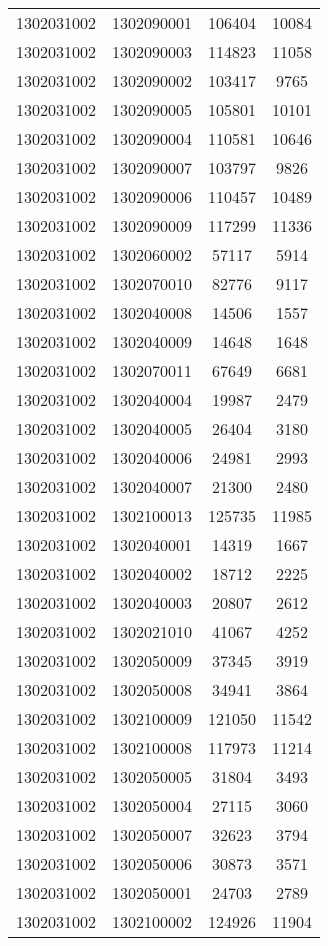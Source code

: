 \begin{longtable}{llcc}
1302031002 & 1302090001 & 106404 & 10084\\
1302031002 & 1302090003 & 114823 & 11058\\
1302031002 & 1302090002 & 103417 & 9765\\
1302031002 & 1302090005 & 105801 & 10101\\
1302031002 & 1302090004 & 110581 & 10646\\
1302031002 & 1302090007 & 103797 & 9826\\
1302031002 & 1302090006 & 110457 & 10489\\
1302031002 & 1302090009 & 117299 & 11336\\
1302031002 & 1302060002 & 57117 & 5914\\
1302031002 & 1302070010 & 82776 & 9117\\
1302031002 & 1302040008 & 14506 & 1557\\
1302031002 & 1302040009 & 14648 & 1648\\
1302031002 & 1302070011 & 67649 & 6681\\
1302031002 & 1302040004 & 19987 & 2479\\
1302031002 & 1302040005 & 26404 & 3180\\
1302031002 & 1302040006 & 24981 & 2993\\
1302031002 & 1302040007 & 21300 & 2480\\
1302031002 & 1302100013 & 125735 & 11985\\
1302031002 & 1302040001 & 14319 & 1667\\
1302031002 & 1302040002 & 18712 & 2225\\
1302031002 & 1302040003 & 20807 & 2612\\
1302031002 & 1302021010 & 41067 & 4252\\
1302031002 & 1302050009 & 37345 & 3919\\
1302031002 & 1302050008 & 34941 & 3864\\
1302031002 & 1302100009 & 121050 & 11542\\
1302031002 & 1302100008 & 117973 & 11214\\
1302031002 & 1302050005 & 31804 & 3493\\
1302031002 & 1302050004 & 27115 & 3060\\
1302031002 & 1302050007 & 32623 & 3794\\
1302031002 & 1302050006 & 30873 & 3571\\
1302031002 & 1302050001 & 24703 & 2789\\
1302031002 & 1302100002 & 124926 & 11904\\

\end{longtable}
